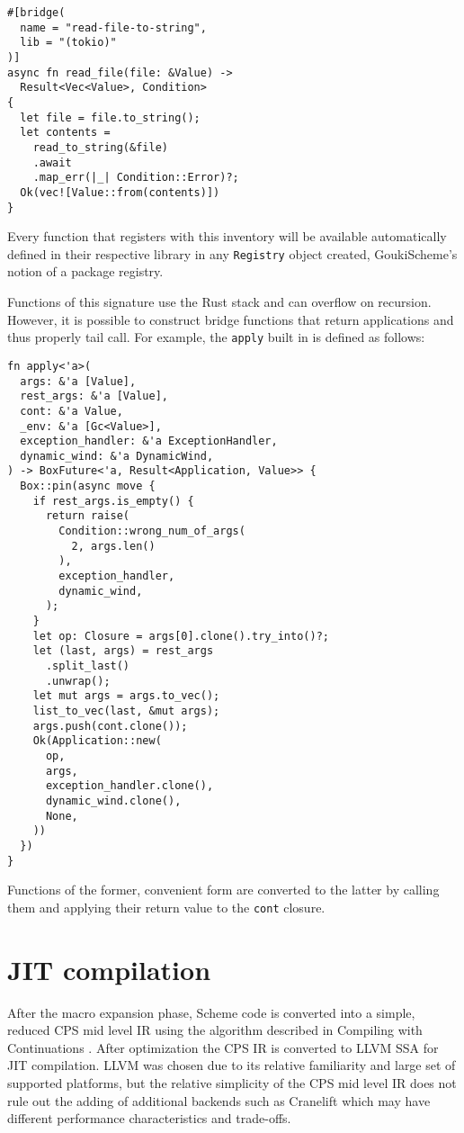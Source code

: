 \documentclass[sigplan]{acmart}
\begin{document}
\begin{verbatim}
#[bridge(
  name = "read-file-to-string",
  lib = "(tokio)"
)]
async fn read_file(file: &Value) ->
  Result<Vec<Value>, Condition>
{
  let file = file.to_string();
  let contents =
    read_to_string(&file)
    .await
    .map_err(|_| Condition::Error)?;
  Ok(vec![Value::from(contents)])
}
\end{verbatim}

Every function that registers with this inventory will be available automatically
defined in their respective library in any \texttt{Registry} object created,
GoukiScheme's notion of a package registry.

Functions of this signature use the Rust stack and can overflow on recursion.
However, it is possible to construct bridge functions that return applications
and thus properly tail call. For example, the \texttt{apply} built in is defined
as follows:

\vfill\null

\begin{verbatim}
fn apply<'a>(
  args: &'a [Value],
  rest_args: &'a [Value],
  cont: &'a Value,
  _env: &'a [Gc<Value>],
  exception_handler: &'a ExceptionHandler,
  dynamic_wind: &'a DynamicWind,
) -> BoxFuture<'a, Result<Application, Value>> {
  Box::pin(async move {
    if rest_args.is_empty() {
      return raise(
        Condition::wrong_num_of_args(
          2, args.len()
        ),
        exception_handler,
        dynamic_wind,
      );
    }
    let op: Closure = args[0].clone().try_into()?;
    let (last, args) = rest_args
      .split_last()
      .unwrap();
    let mut args = args.to_vec();
    list_to_vec(last, &mut args);
    args.push(cont.clone());
    Ok(Application::new(
      op,
      args,
      exception_handler.clone(),
      dynamic_wind.clone(),
      None,
    ))
  })
}
\end{verbatim}

Functions of the former, convenient form are converted to the latter by calling
them and applying their return value to the \texttt{cont} closure.


\section{JIT compilation}

After the macro expansion phase, Scheme code is converted into a simple, reduced
CPS mid level IR using the algorithm described in Compiling with
Continuations \cite{cwc}. After optimization the CPS IR is converted to
LLVM SSA \cite{llvm} for JIT compilation. LLVM was chosen due to its relative
familiarity and large set of supported platforms, but the relative simplicity of
the CPS mid level IR does not rule out the adding of additional backends such
as Cranelift \cite{cranelift} which may have different performance
characteristics and trade-offs.
\end{document}
